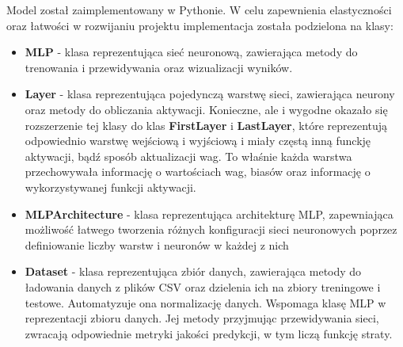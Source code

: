 \documentclass{article}
\begin{document}
Model został zaimplementowany w Pythonie. W celu zapewnienia elastyczności oraz łatwości w rozwijaniu projektu implementacja została podzielona na klasy:
\begin{itemize}
    \item \textbf{MLP} - klasa reprezentująca sieć neuronową, zawierająca metody do trenowania i przewidywania oraz wizualizacji wyników.
    \item \textbf{Layer} - klasa reprezentująca pojedynczą warstwę sieci, zawierająca neurony oraz metody do obliczania aktywacji. Konieczne, ale i wygodne okazało się rozszerzenie tej klasy do klas \textbf{FirstLayer} i \textbf{LastLayer}, które reprezentują odpowiednio warstwę wejściową i wyjściową i miały częstą inną funckję aktywacji, bądź sposób aktualizacji wag. To właśnie każda warstwa przechowywała informację o wartościach wag, biasów oraz informację o wykorzystywanej funkcji aktywacji.
    \item \textbf{MLPArchitecture} - klasa reprezentująca architekturę MLP, zapewniająca możliwość łatwego tworzenia różnych konfiguracji sieci neuronowych poprzez definiowanie liczby warstw i neuronów w każdej z nich
    \item \textbf{Dataset} - klasa reprezentująca zbiór danych, zawierająca metody do ładowania danych z plików CSV oraz dzielenia ich na zbiory treningowe i testowe. Automatyzuje ona normalizację danych. Wspomaga klasę MLP w reprezentacji zbioru danych. Jej metody przyjmując przewidywania sieci, zwracają odpowiednie metryki jakości predykcji, w tym liczą funkcję straty.
\end{itemize}
\end{document}
